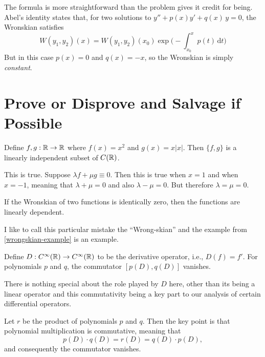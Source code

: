 \documentclass{homework}
\begin{document}
\begin{solution}
  The formula is more straightforward than the problem gives it credit
  for being.   Abel's identity states that, for two solutions to $y'' + p(x)y' + q(x)\,y = 0$, the Wronskian satisfies
  \[
    \displaystyle W(y_{1},y_{2})(x)=W(y_{1},y_{2})(x_{0})\exp {\biggl (}-\int _{x_{0}}^{x}p(t)\,{\textrm {d}}t{\biggr )}
  \]
  But in this case $p(x) = 0$ and $q(x) = -x$, so the Wronskian is simply \textit{constant}.
\end{solution}

\section{Prove or Disprove and Salvage if Possible}

\begin{problem}\label{wrongskian-example}Define $f, g : \mathbb{R} \to \mathbb{R}$ where $f(x) = x^2$ and $g(x) = x |x|$.  Then $\{ f, g \}$ is a linearly independent subset of $C(\mathbb{R})$.
\end{problem}

\begin{solution}
  This is true.  Suppose $\lambda f + \mu g \equiv 0$.  Then this is true when $x = 1$ and when $x = -1$, meaning that $\lambda + \mu = 0$ and also $\lambda - \mu = 0$.  But therefore $\lambda = \mu = 0$.
\end{solution}

\begin{problem}\label{wronskian-misconception}If the Wronskian of two functions is identically zero, then the
  functions are linearly dependent.
\end{problem}

\begin{solution}
  I like to call this particular mistake the ``Wrong-skian'' and the
  example from \ref{wrongskian-example} is an example.
\end{solution}

\begin{problem}Define $D : C^\infty(\mathbb{R}) \to C^\infty(\mathbb{R})$ to be the
  derivative operator, i.e., $D(f) = f'$.  For polynomials $p$ and
  $q$, the commutator $[p(D),q(D)]$ vanishes.
\end{problem}

\begin{solution}
  There is nothing special about the role played by $D$ here, other
  than its being a linear operator and this commutativity being a key
  part to our analysis of certain differential operators.

  Let $r$ be the product of polynomials $p$ and $q$.  Then the key
  point is that polynomial multiplication is commutative, meaning that
  \[
    p(D) \cdot q(D) = r(D) = q(D) \cdot p(D),
  \]
  and consequently the commutator vanishes.
\end{solution}
\end{document}
